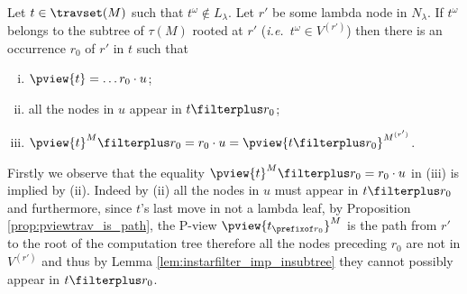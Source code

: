 \begin{lemma}
\label{lem:pview_trav_filtering}
   Let $t \in \travset(M)$ such that $t^\omega \not\in L_\lambda$.
   Let $r'$ be some lambda node in $N_\lambda$.
        If $t^\omega$ belongs to the subtree of $\tau(M)$ rooted at $r'$ ({\it i.e.}\ $t^\omega \in V^{(r')}$) then there is an occurrence $r_0$ of $r'$ in $t$ such that
        \begin{enumerate}[(i)]
        \item $\pview{t} = \ldots r_0 \cdot u$;
        \item all the nodes in $u$ appear in $t\filterplus r_0$;
        \item $\pview{t}^M \filterplus r_0 = r_0\cdot u =  \pview{t\filterplus r_0}^{M^{(r')}}$.
        \end{enumerate}

\end{lemma}
\proof
Firstly we observe that the equality $\pview{t}^M \filterplus r_0 = r_0\cdot u$
in (iii) is implied by (ii). Indeed by (ii) all the nodes in $u$ must appear in $t\filterplus r_0$ and furthermore, since $t$'s last move in not a lambda leaf, by Proposition \ref{prop:pviewtrav_is_path}, the P-view $\pview{t_{\prefixof r_0}}^M$ is the path from $r'$ to the root of the computation tree therefore all the nodes preceding $r_0$ are not in $V^{(r')}$ and thus by Lemma \ref{lem:instarfilter_imp_insubtree} they cannot possibly appear in $t \filterplus r_0$.

